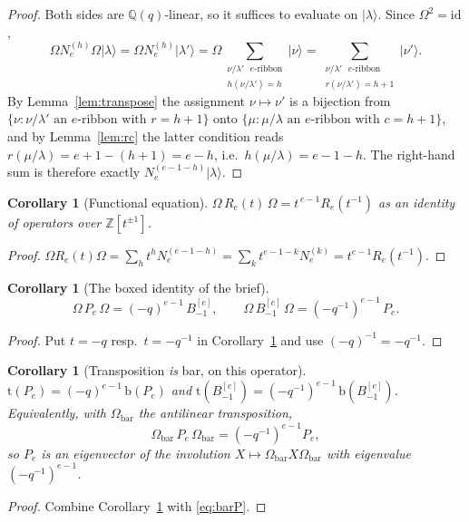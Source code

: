 \documentclass[11pt]{article}
\theoremstyle{plain}
\newtheorem{corollary}[theorem]{Corollary}
\theoremstyle{definition}
\newcommand{\Om}{\Omega}
\newcommand{\Ombar}{\Om_{\mathrm{bar}}}
\newcommand{\Bm}{B_{-1}^{[e]}}
\newcommand{\N}[1]{N_e^{(#1)}}
\begin{document}
\begin{proof}
Both sides are $\mathbb{Q}(q)$-linear, so it suffices to evaluate on
$\lvert\lambda\rangle$.  Since $\Om^2=\mathrm{id}$,
\[
  \Om\N{h}\Om\lvert\lambda\rangle
  =\Om\N{h}\lvert\lambda'\rangle
  =\Om\!\!\sum_{\substack{\nu/\lambda' \text{ $e$-ribbon}\\ h(\nu/\lambda')=h}}\!\!\lvert\nu\rangle
  =\!\!\sum_{\substack{\nu/\lambda' \text{ $e$-ribbon}\\ r(\nu/\lambda')=h+1}}\!\!\lvert\nu'\rangle .
\]
By Lemma~\ref{lem:transpose} the assignment $\nu\mapsto\nu'$ is a bijection
from $\{\nu:\nu/\lambda' \text{ an $e$-ribbon with } r=h+1\}$ onto
$\{\mu:\mu/\lambda \text{ an $e$-ribbon with } c=h+1\}$, and by
Lemma~\ref{lem:rc} the latter condition reads $r(\mu/\lambda)=e+1-(h+1)=e-h$,
i.e.\ $h(\mu/\lambda)=e-1-h$.  The right-hand sum is therefore exactly
$\N{e-1-h}\lvert\lambda\rangle$.
\end{proof}

\begin{corollary}[Functional equation]\label{cor:funeq}
$\Om\,R_e(t)\,\Om=t^{\,e-1}R_e(t^{-1})$ as an identity of operators over
$\mathbb{Z}[t^{\pm1}]$.
\end{corollary}
\begin{proof}
$\Om R_e(t)\Om=\sum_h t^h\N{e-1-h}=\sum_k t^{e-1-k}\N{k}=t^{e-1}R_e(t^{-1})$.
\end{proof}

\begin{corollary}[The boxed identity of the brief]\label{cor:boxed}
\[
  \Om\,P_e\,\Om=(-q)^{e-1}\,\Bm,
  \qquad
  \Om\,\Bm\,\Om=(-q^{-1})^{e-1}\,P_e .
\]
\end{corollary}
\begin{proof}
Put $t=-q$ resp.\ $t=-q^{-1}$ in Corollary~\ref{cor:funeq} and use
$(-q)^{-1}=-q^{-1}$.
\end{proof}

\begin{corollary}[Transposition \emph{is} bar, on this operator]\label{cor:tb}
$\mathrm{t}(P_e)=(-q)^{e-1}\,\mathrm{b}(P_e)$ and
$\mathrm{t}(\Bm)=(-q^{-1})^{e-1}\,\mathrm{b}(\Bm)$.  Equivalently, with
$\Ombar$ the antilinear transposition,
\[
  \Ombar\,P_e\,\Ombar=(-q^{-1})^{e-1}P_e ,
\]
so $P_e$ is an eigenvector of the involution $X\mapsto\Ombar X\Ombar$ with
eigenvalue $(-q^{-1})^{e-1}$.
\end{corollary}
\begin{proof}
Combine Corollary~\ref{cor:boxed} with \eqref{eq:barP}.
\end{proof}
\end{document}

